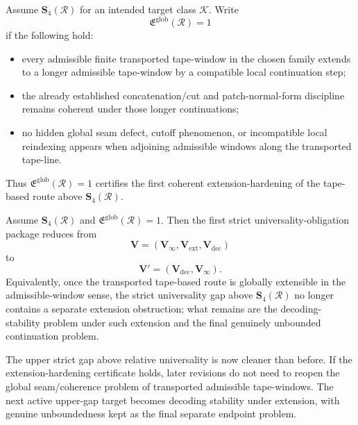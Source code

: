 \begin{definition}
Assume \(\mathbf S_4(\mathcal R)\) for an intended target class \(\mathcal K\).
Write
\[
\mathfrak E^{\mathrm{glob}}(\mathcal R)=1
\]
if the following hold:
\begin{itemize}[leftmargin=2em]
  \item every admissible finite transported tape-window in the chosen family extends to a longer admissible tape-window by a compatible local continuation step;
  \item the already established concatenation/cut and patch-normal-form discipline remains coherent under those longer continuations;
  \item no hidden global seam defect, cutoff phenomenon, or incompatible local reindexing appears when adjoining admissible windows along the transported tape-line.
\end{itemize}
Thus \(\mathfrak E^{\mathrm{glob}}(\mathcal R)=1\) certifies the first coherent extension-hardening of the tape-based route above \(\mathbf S_4(\mathcal R)\).
\end{definition}

\begin{proposition}
Assume \(\mathbf S_4(\mathcal R)\) and \(\mathfrak E^{\mathrm{glob}}(\mathcal R)=1\). Then the first strict universality-obligation package reduces from
\[
\mathbf V=(\mathbf V_\infty,\mathbf V_{\mathrm{ext}},\mathbf V_{\mathrm{dec}})
\]
to
\[
\mathbf V'=(\mathbf V_{\mathrm{dec}},\mathbf V_\infty).
\]
Equivalently, once the transported tape-based route is globally extensible in the admissible-window sense, the strict universality gap above \(\mathbf S_4(\mathcal R)\) no longer contains a separate extension obstruction; what remains are the decoding-stability problem under such extension and the final genuinely unbounded continuation problem.
\end{proposition}

\begin{corollary}
The upper strict gap above relative universality is now cleaner than before. If the extension-hardening certificate holds, later revisions do not need to reopen the global seam/coherence problem of transported admissible tape-windows. The next active upper-gap target becomes decoding stability under extension, with genuine unboundedness kept as the final separate endpoint problem.
\end{corollary}


